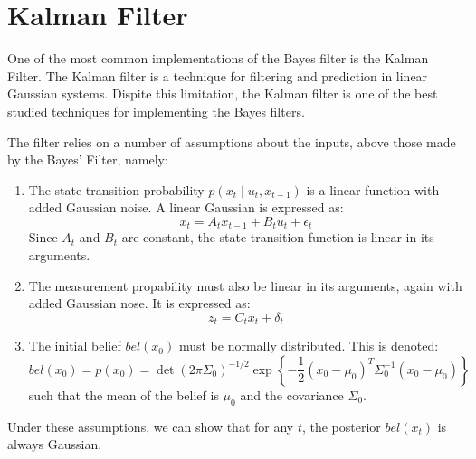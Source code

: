 \documentclass[english]{article}
\begin{document}
 




\section*{Kalman Filter}

One of the most common implementations of the Bayes filter is the Kalman Filter. The Kalman filter is a technique for filtering and prediction in linear Gaussian systems. Dispite this limitation, the Kalman filter is one of the best studied techniques for implementing the Bayes filters.

The filter relies on a number of assumptions about the inputs, above those made by the Bayes' Filter, namely:
\begin{enumerate}
	\item The state transition probability $p(x_t \mid u_t,x_{t-1})$ is a linear function with added Gaussian noise. A linear Gaussian is expressed as:
		\begin{equation}
			x_t = A_t x_{t-1} + B_t u_t + \epsilon _t
		\end{equation}
		Since $A_t$ and $B_t$ are constant, the state transition function is linear in its arguments.
	\item The measurement propability must also be linear in its arguments, again with added Gaussian nose. It is expressed as:
		\begin{equation}
			z_t = C_t x_t + \delta _t
		\end{equation}
	\item The initial belief $bel(x_0)$ must be normally distributed. This is denoted:
		\begin{equation}
			bel(x_0) = p(x_0) = \det(2 \pi \Sigma_0)^{-1/2} \exp\left\{-\frac{1}{2}(x_0-\mu_0)^T \Sigma_0^{-1}(x_0-\mu_0)\right\}
		\end{equation}
		such that the mean of the belief is $\mu_0$ and the covariance $\Sigma_0$.
\end{enumerate}
Under these assumptions, we can show that for any $t$, the posterior $bel(x_t)$ is always Gaussian.
\end{document}
